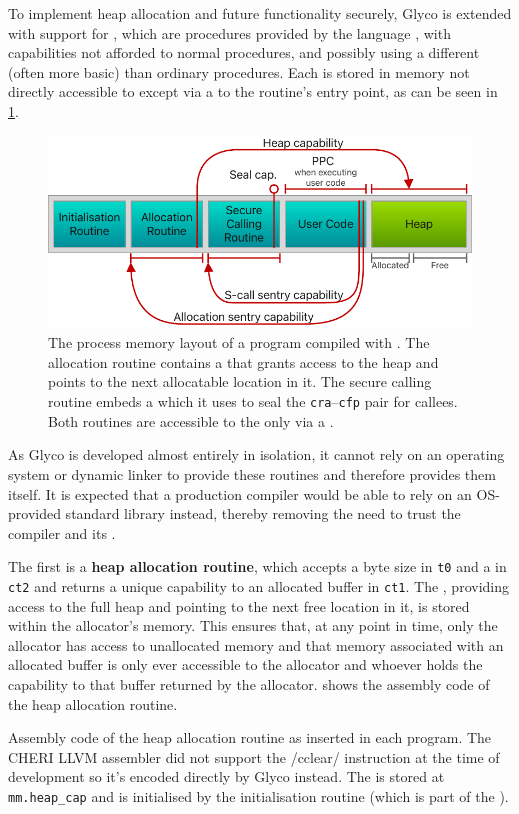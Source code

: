 \documentclass[main.tex]{subfiles}
\begin{document}
To implement heap allocation and future functionality securely, Glyco is extended with support for , which are procedures provided by the language , with capabilities not afforded to normal procedures, and possibly using a different (often more basic)  than ordinary procedures. Each  is stored in memory not directly accessible to  except via a  to the routine's entry point, as can be seen in \cref{fig:procmem}.

\begin{figure}
	\centering
	\includegraphics{Images/GHSCC Process Memory.pdf}
	\caption{The process memory layout of a program compiled with . The allocation routine contains a  that grants access to the heap and points to the next allocatable location in it. The secure calling routine embeds a  which it uses to seal the \texttt{cra}–\texttt{cfp} pair for callees. Both routines are accessible to the  only via a .}
	\label{fig:procmem}
\end{figure}

As Glyco is developed almost entirely in isolation, it cannot rely on an operating system or dynamic linker to provide these routines and therefore provides them itself. It is expected that a production compiler would be able to rely on an OS-provided standard library instead, thereby removing the need to trust the compiler and its .

The first  is a \textbf{heap allocation routine}, which accepts a byte size in \texttt{t0} and a  in \texttt{ct2} and returns a unique capability to an allocated buffer in \texttt{ct1}. The , providing access to the full heap and pointing to the next free location in it, is stored within the allocator's memory. This ensures that, at any point in time, only the allocator has access to unallocated memory and that memory associated with an allocated buffer is only ever accessible to the allocator and whoever holds the capability to that buffer returned by the allocator.  shows the assembly code of the heap allocation routine.
\begin{listing}
	\caption{Assembly code of the heap allocation routine as inserted in each program. The CHERI LLVM assembler did not support the \iasm/cclear/ instruction at the time of development so it's encoded directly by Glyco instead. The  is stored at \texttt{mm.heap_cap} and is initialised by the initialisation routine (which is part of the ).}
	\label{lst:alloc}
\end{listing}
\end{document}
